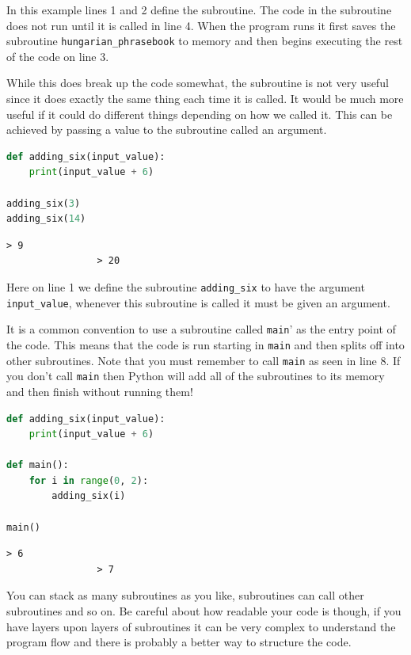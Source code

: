 In this example lines 1 and 2 define the subroutine. The code in the subroutine does not run until it is called in line 4. When the program runs it first saves the subroutine \texttt{hungarian\_phrasebook} to memory and then begins executing the rest of the code on line 3. 

While this does break up the code somewhat, the subroutine is not very useful since it does exactly the same thing each time it is called. It would be much more useful if it could do different things depending on how we called it. This can be achieved by passing a value to the subroutine called an argument.

			\begin{lstlisting}[language=Python]
def adding_six(input_value):
	print(input_value + 6)

adding_six(3)
adding_six(14)\end{lstlisting}
			\begin{verbatim}> 9
				> 20\end{verbatim}

				Here on line 1 we define the subroutine \texttt{adding\_six} to have the argument \texttt{input\_value}, whenever this subroutine is called it must be given an argument. 

It is a common convention to use a subroutine called \texttt{main}' as the entry point of the code. This means that the code is run starting in \texttt{main} and then splits off into other subroutines. Note that you must remember to call \texttt{main} as seen in line 8. If you don't call \texttt{main} then Python will add all of the subroutines to its memory and then finish without running them!
				
			\begin{lstlisting}[language=Python]
def adding_six(input_value):
	print(input_value + 6)

def main():
	for i in range(0, 2):
		adding_six(i)
		
main()\end{lstlisting}
			\begin{verbatim}> 6
				> 7\end{verbatim}
				
				You can stack as many subroutines as you like, subroutines can call other subroutines and so on. Be careful about how readable your code is though, if you have layers upon layers of subroutines it can be very complex to understand the program flow and there is probably a better way to structure the code. 

